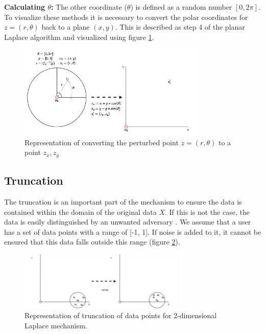 \textbf{Calculating $\theta$:}
The other coordinate ($\theta$) is defined as a random number $[0, 2\pi]$. \newline
To visualize these methods it is necessary to convert the polar coordinates for $z = (r, \theta)$ back to a plane $(x, y)$.
This is described as step 4 of the planar Laplace algorithm \citep{DBLP:journals/corr/abs-1212-1984} and visualized using figure \ref{figure:geo}.
\begin{figure}[h]
  \includegraphics[width=0.8\textwidth]{TheorethicalFramework/ND-Laplace/Images/polar-laplace-to-planar.png}
  \centering
  \caption{Representation of converting the perturbed point $z = (r, \theta)$ to a point ${z_x, z_y}$}
  \label{figure:geo}
\end{figure}



\newpage
\subsection{Truncation} \label{theory:truncation}
The truncation is an important part of the mechanism to ensure the data is contained within the domain of the original data $X$.
If this is not the case, the data is easily distinguished by an unwanted adversary \citep{DBLP:journals/corr/abs-1212-1984,9646489}.
We assume that a user has a set of data points with a range of [-1, 1].
If noise is added to it, it cannot be ensured that this data falls outside this range (figure \ref{figure:truncation-2d}).
\begin{figure}[ht]
  \includegraphics[width=0.7\textwidth]{TheorethicalFramework/ND-Laplace/Images/remapping.png}
  \caption{Representation of truncation of data points for 2-dimensional Laplace mechanism.}
  \label{figure:truncation-2d}
\end{figure}

